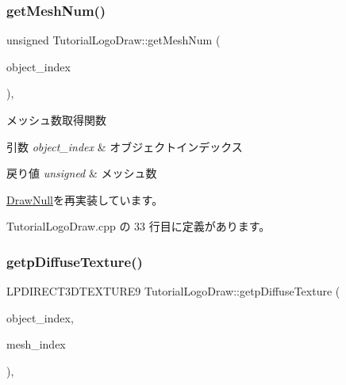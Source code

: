 \subsubsection{\texorpdfstring{get\+Mesh\+Num()}{getMeshNum()}}
{\footnotesize\ttfamily unsigned Tutorial\+Logo\+Draw\+::get\+Mesh\+Num (\begin{DoxyParamCaption}\item[{unsigned}]{object\+\_\+index }\end{DoxyParamCaption})\hspace{0.3cm}{\ttfamily [override]}, {\ttfamily [virtual]}}



メッシュ数取得関数 


\begin{DoxyParams}{引数}
{\em object\+\_\+index} & オブジェクトインデックス \\
\hline
\end{DoxyParams}

\begin{DoxyRetVals}{戻り値}
{\em unsigned} & メッシュ数 \\
\hline
\end{DoxyRetVals}


\mbox{\hyperlink{class_draw_null_a4c566a37d27fac3dcf76c7970443f375}{Draw\+Null}}を再実装しています。



 Tutorial\+Logo\+Draw.\+cpp の 33 行目に定義があります。

\mbox{\label{class_tutorial_logo_draw_a80a3858068af2dcbd1ffc7e59c212924}} 
\subsubsection{\texorpdfstring{getp\+Diffuse\+Texture()}{getpDiffuseTexture()}}
{\footnotesize\ttfamily L\+P\+D\+I\+R\+E\+C\+T3\+D\+T\+E\+X\+T\+U\+R\+E9 Tutorial\+Logo\+Draw\+::getp\+Diffuse\+Texture (\begin{DoxyParamCaption}\item[{unsigned}]{object\+\_\+index,  }\item[{unsigned}]{mesh\+\_\+index }\end{DoxyParamCaption})\hspace{0.3cm}{\ttfamily [override]}, {\ttfamily [virtual]}}



